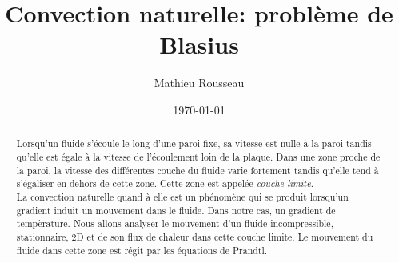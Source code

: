 \documentclass[a4paper]{tufte-handout}
\title{Convection naturelle: problème de Blasius}
\author{Mathieu Rousseau}
\date{\today}
\theoremstyle{break}
\begin{document}
\maketitle
\tableofcontents

\newpage

\begin{abstract}
  Lorsqu'un fluide s'écoule le long d'une paroi fixe, sa vitesse est nulle à la paroi tandis qu'elle est égale à la vitesse de l'écoulement loin de la plaque. Dans une zone proche de la paroi, la vitesse des différentes couche du fluide varie fortement tandis qu'elle tend à s'égaliser en dehors de cette zone. Cette zone est appelée \textit{couche limite}. \\
  \noindent La convection naturelle quand à elle est un phénomène qui se produit lorsqu'un gradient induit un mouvement dans le fluide. Dans notre cas, un gradient de tempèrature.
  \noindent Nous allons analyser le mouvement d'un fluide incompressible, stationnaire, 2D et de son flux de chaleur dans cette couche limite. Le mouvement du fluide dans cette zone est régit par les équations de Prandtl.
\end{abstract}






\end{document}

